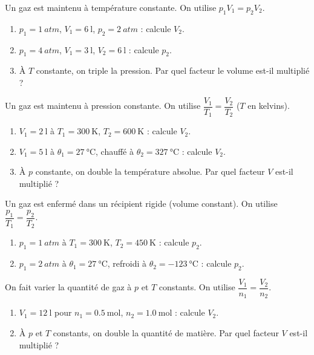 \documentclass[11pt,a4paper]{article}
\begin{document}
\begin{exo}
Un gaz est maintenu à température constante. On utilise $p_1 V_1 = p_2 V_2$.
\begin{enumerate}[label=\alph*)]
  \item $p_1=\qty{1}{atm}$, $V_1=\qty{6}{\litre}$, $p_2=\qty{2}{atm}$ : calcule $V_2$.
  \item $p_1=\qty{4}{atm}$, $V_1=\qty{3}{\litre}$, $V_2=\qty{6}{\litre}$ : calcule $p_2$.
  \item À $T$ constante, on triple la pression. Par quel facteur le volume est-il multiplié ?
\end{enumerate}
\end{exo}

\begin{exo}
Un gaz est maintenu à pression constante. On utilise $\dfrac{V_1}{T_1}=\dfrac{V_2}{T_2}$ ($T$ en
kelvins).
\begin{enumerate}[label=\alph*)]
  \item $V_1=\qty{2}{\litre}$ à $T_1=\qty{300}{\kelvin}$, $T_2=\qty{600}{\kelvin}$ : calcule $V_2$.
  \item $V_1=\qty{5}{\litre}$ à $\theta_1=\qty{27}{\degreeCelsius}$, chauffé à
        $\theta_2=\qty{327}{\degreeCelsius}$ : calcule $V_2$.
  \item À $p$ constante, on double la température absolue. Par quel facteur $V$ est-il multiplié ?
\end{enumerate}
\end{exo}

\begin{exo}
Un gaz est enfermé dans un récipient rigide (volume constant). On utilise
$\dfrac{p_1}{T_1}=\dfrac{p_2}{T_2}$.
\begin{enumerate}[label=\alph*)]
  \item $p_1=\qty{1}{atm}$ à $T_1=\qty{300}{\kelvin}$, $T_2=\qty{450}{\kelvin}$ : calcule $p_2$.
  \item $p_1=\qty{2}{atm}$ à $\theta_1=\qty{27}{\degreeCelsius}$, refroidi à
        $\theta_2=\qty{-123}{\degreeCelsius}$ : calcule $p_2$.
\end{enumerate}
\end{exo}

\begin{exo}
On fait varier la quantité de gaz à $p$ et $T$ constants. On utilise $\dfrac{V_1}{n_1}=\dfrac{V_2}{n_2}$.
\begin{enumerate}[label=\alph*)]
  \item $V_1=\qty{12}{\litre}$ pour $n_1=\qty{0.5}{\mole}$, $n_2=\qty{1.0}{\mole}$ : calcule $V_2$.
  \item À $p$ et $T$ constants, on double la quantité de matière. Par quel facteur $V$ est-il
        multiplié ?
\end{enumerate}
\end{exo}
\end{document}
